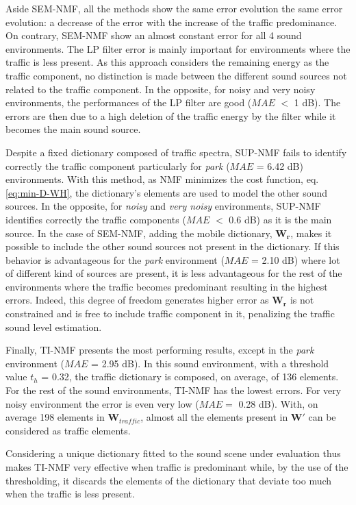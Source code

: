 \documentclass[review,5p,twocolumn,sort&compress,times]{elsarticle}
\begin{document}
Aside SEM-NMF, all the methods show the same error evolution the same error evolution: a decrease of the error with the increase of the traffic predominance. On contrary, SEM-NMF show an almost constant error for all 4 sound environments. The LP filter error is mainly important for environments where the traffic is less present. As this approach considers the remaining energy as the traffic component, no distinction is made between the different sound sources not related to the traffic component. In the opposite, for noisy and very noisy environments, the performances of the LP filter are good ($MAE$ $<$ 1 dB). The errors are then due to a high deletion of the traffic energy by the filter while it becomes the main sound source.

Despite a fixed dictionary composed of traffic spectra, SUP-NMF fails to identify correctly the traffic component particularly for \textit{park} ($MAE$ = 6.42 dB) environments. With this method, as NMF minimizes the cost function, eq. \ref{eq:min-D-WH}, the dictionary's elements are used to model the other sound sources. In the opposite, for \textit{noisy} and \textit{very noisy} environments, SUP-NMF identifies correctly the traffic components ($MAE$ $<$ 0.6 dB) as it is the main source.
In the case of SEM-NMF, adding the mobile dictionary, $\mathbf{W_r}$, makes it possible to include the other sound sources not present in the dictionary. If this behavior is advantageous for the \textit{park} environment ($MAE$ = 2.10 dB) where lot of different kind of sources are present, it is less advantageous for the rest of the environments where the traffic becomes predominant resulting in the highest errors. Indeed, this degree of freedom generates higher error as $\mathbf{W_r}$ is not constrained and is free to include traffic component in it, penalizing the traffic sound level estimation.

Finally, TI-NMF presents the most performing results, except in the \textit{park} environment ($MAE$ = 2.95 dB). In this sound environment, with a threshold value $t_h$ = 0.32, the traffic dictionary is composed, on average, of 136 elements. For the rest of the sound environments, TI-NMF has the lowest errors. For very noisy environment the error is even very low ($MAE=$ 0.28 dB). With, on average 198 elements in $\mathbf{W}_{traffic}$, almost all the elements present in $\mathbf{W'}$ can be considered as traffic elements. 

Considering a unique dictionary fitted to the sound scene under evaluation thus makes TI-NMF very effective when traffic is predominant while, by the use of the thresholding, it discards the elements of the dictionary that deviate too much when the traffic is less present.
\end{document}
